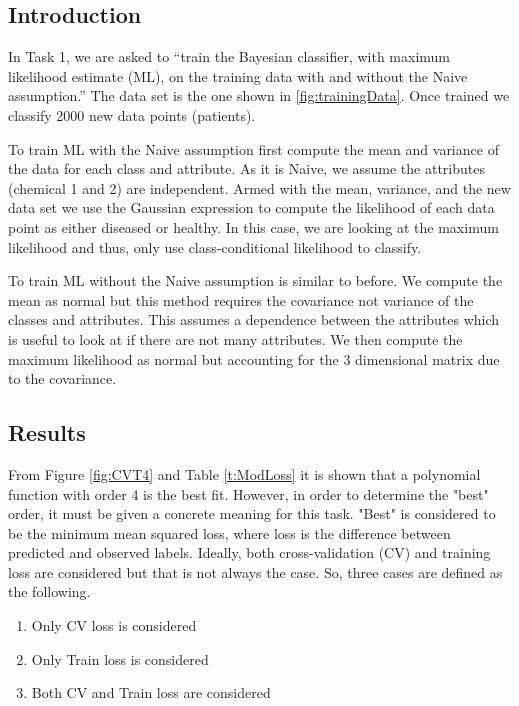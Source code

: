 {{	\subsection{Introduction}\label{Int}
In Task 1, we are asked to ``train the Bayesian classifier, with maximum likelihood estimate (ML), on the training data with and without the Naive assumption.'' The data set is the one shown in \ref{fig:trainingData}. Once trained we classify 2000 new data points (patients).

To train ML with the Naive assumption first compute the mean and variance of the data for each class and attribute. As it is Naive, we assume the attributes (chemical 1 and 2) are independent. Armed with the mean, variance, and the new data set we use the Gaussian expression to compute the likelihood of each data point as either diseased or healthy. In this case, we are looking at the maximum likelihood and thus, only use class-conditional likelihood to classify. 

To train ML without the Naive assumption is similar to before. We compute the mean as normal but this method requires the covariance not variance of the classes and attributes. This assumes a dependence between the attributes which is useful to look at if there are not many attributes. We then compute the maximum likelihood as normal but accounting for the 3 dimensional matrix due to the covariance.
	
	\subsection{Results}\label{CVcons}
	From Figure \ref{fig:CVT4} and Table \ref{t:ModLoss} it is shown that a polynomial function with order 4 is the best fit. However, in order to determine the "best" order, it must be given a concrete meaning for this task. "Best" is considered to be the minimum mean squared loss, where loss is the difference between predicted and observed labels. Ideally, both cross-validation (CV) and training loss are considered but that is not always the case. So, three cases are defined as the following.
	
	\begin{enumerate}
		\item Only CV loss is considered
		\item Only Train loss is considered
		\item Both CV and Train loss are considered
	\end{enumerate}
	
}}
